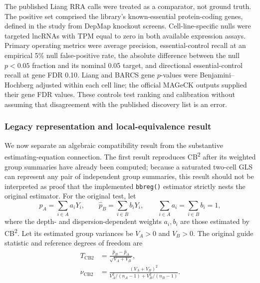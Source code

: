 The published Liang RRA calls were treated as a comparator, not ground truth.
The positive set comprised the library's known-essential protein-coding
genes, defined in the study from DepMap knockout screens.  Cell-line-specific
nulls were targeted lncRNAs with TPM equal to zero in both available
expression assays.  Primary operating metrics were average precision,
essential-control recall at an empirical 5\% null false-positive rate, the
absolute difference between the null $p<0.05$ fraction and its nominal 0.05
target, and directional essential-control recall at gene FDR 0.10.  Liang and
BARCS gene $p$-values were Benjamini--Hochberg adjusted within each cell line;
the official MAGeCK outputs supplied their gene FDR values.  These controls
test ranking and calibration without assuming that disagreement with the
published discovery list is an error.

\subsubsection{Legacy representation and local-equivalence result}

We now separate an algebraic compatibility result from the substantive
estimating-equation connection.  The first result reproduces
CB\textsuperscript{2} after its weighted group summaries have already been
computed; because a saturated two-cell GLS can represent any pair of
independent group summaries, this result should not be interpreted as proof
that the implemented \texttt{bbreg()} estimator strictly nests the original
estimator.  For the original test, let
\[
 \widehat p_A=\sum_{i\in A}a_iY_i,\qquad
 \widehat p_B=\sum_{i\in B}b_iY_i,
 \qquad \sum_{i\in A}a_i=\sum_{i\in B}b_i=1,
\]
where the depth- and dispersion-dependent weights $a_i,b_i$ are those
estimated by CB\textsuperscript{2}.  Let its estimated group variances be
$V_A>0$ and $V_B>0$.  The original guide statistic and reference degrees of
freedom are
\begin{align}
 T_{\mathrm{CB2}} &=
 \frac{\widehat p_B-\widehat p_A}{\sqrt{V_A+V_B}}, \label{eq:legacyt}\\
 \nu_{\mathrm{CB2}} &=
 \frac{(V_A+V_B)^2}
 {V_A^2/(n_A-1)+V_B^2/(n_B-1)}. \label{eq:legacydf}
\end{align}


